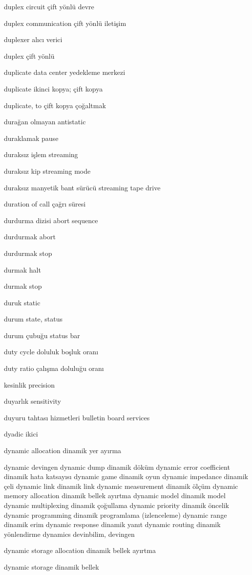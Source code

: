 \documentclass[12pt,fleqn]{article}\usepackage{../../common}
\begin{document}
duplex circuit çift yönlü devre

duplex communication çift yönlü iletişim

duplexer alıcı verici

duplex çift yönlü

duplicate data center yedekleme merkezi

duplicate ikinci kopya; çift kopya

duplicate, to çift kopya çoğaltmak

durağan olmayan antistatic

duraklamak pause

duraksız işlem streaming

duraksız kip streaming mode

duraksız manyetik bant sürücü streaming tape drive

duration of call çağrı süresi

durdurma dizisi abort sequence

durdurmak abort

durdurmak stop

durmak halt

durmak stop

duruk static

durum state, status

durum çubuğu status bar

duty cycle doluluk boşluk oranı

duty ratio çalışma doluluğu oranı

kesinlik precision

duyarlık sensitivity

duyuru tahtası hizmetleri bulletin board services

dyadic ikici

dynamic allocation dinamik yer ayırma

dynamic devingen
dynamic dump dinamik döküm
dynamic error coefficient dinamik hata katsayısı
dynamic game dinamik oyun
dynamic impedance dinamik çeli
dynamic link dinamik link
dynamic measurement dinamik ölçüm
dynamic memory allocation dinamik bellek ayırtma
dynamic model dinamik model
dynamic multiplexing dinamik çoğullama
dynamic priority dinamik öncelik
dynamic programming dinamik programlama (izlenceleme)
dynamic range dinamik erim
dynamic response dinamik yanıt
dynamic routing dinamik yönlendirme
dynamics devinbilim, devingen

dynamic storage allocation dinamik bellek ayırtma

dynamic storage dinamik bellek
\end{document}
